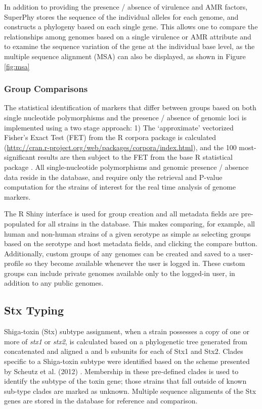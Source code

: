 \documentclass[doublespacing, linenumbers]{bmcart}
\begin{document}
In addition to providing the presence / absence of virulence and AMR factors, SuperPhy stores the sequence of the individual alleles for each genome, and constructs a phylogeny based on each single gene. This allows one to compare the relationships among genomes based on a single virulence or AMR attribute and to examine the sequence variation of the gene at the individual base level, as the multiple sequence alignment (MSA) can also be displayed, as shown in Figure \ref{fig:msa}

\subsubsection{Group Comparisons}
The statistical identification of markers that differ between groups based on both single nucleotide polymorphisms and the presence / absence of genomic loci is implemented using a two stage approach: 1) The `approximate' vectorized Fisher’s Exact Test (FET) from the R corpora package is calculated (\url{http://cran.r-project.org/web/packages/corpora/index.html}), and the 100 most-significant results are then subject to the FET from the base R statistical package \cite{r_foundation_for_statistical_computing_r:_2005}. All single-nucleotide polymorphisms and genomic presence / absence data reside in the database, and require only the retrieval and P-value computation for the strains of interest for the real time analysis of genome markers.

The R Shiny interface is used for group creation and all metadata fields are pre-populated for all strains in the database. This makes comparing, for example, all human and non-human strains of a given serotype as simple as selecting groups based on the serotype and host metadata fields, and clicking the compare button. Additionally, custom groups of any genomes can be created and saved to a user-profile so they become available whenever the user is logged in. These custom groups can include private genomes available only to the logged-in user, in addition to any public genomes.

\subsection{Stx Typing}
Shiga-toxin (Stx) subtype assignment, when a strain possesses a copy of one or more of \textit{stx1} or \textit{stx2}, is calculated based on a phylogenetic tree generated from concatenated and aligned a and b subunits for each of Stx1 and Stx2. Clades specific to a Shiga-toxin subtype were identified based on the scheme presented by Scheutz et al. (2012) \cite{scheutz_multicenter_2012}. Membership in these pre-defined clades is used to identify the subtype of the toxin gene; those strains that fall outside of known sub-type clades are marked as unknown. Multiple sequence alignments of the Stx genes are stored in the database for reference and comparison.
\end{document}
